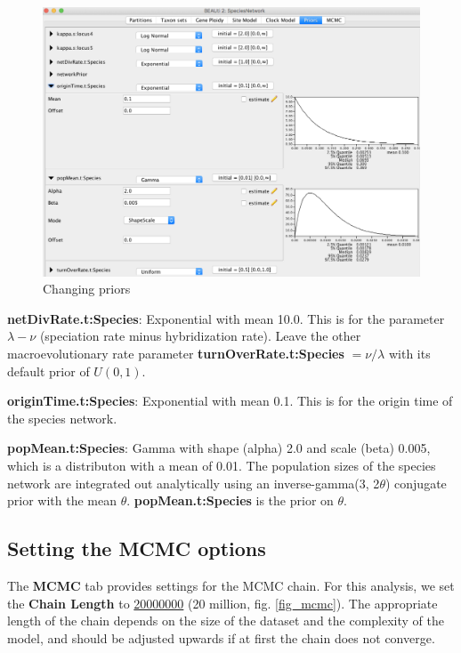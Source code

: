 \documentclass[11pt]{article}
\begin{document}
\begin{figure}[h]
\center
\includegraphics[width=1.0\textwidth]{figs/fig7_priors.png}
\caption{Changing priors}
\label{fig_priors}
\end{figure}

\textbf{netDivRate.t:Species}: Exponential with mean 10.0. This is for the parameter $\lambda-\nu$ (speciation rate minus hybridization rate). Leave the other macroevolutionary rate parameter \textbf{turnOverRate.t:Species} $=\nu/\lambda$ with its default prior of $U(0,1)$.

\textbf{originTime.t:Species}: Exponential with mean 0.1. This is for the origin time of the species network. 

\textbf{popMean.t:Species}: Gamma with shape (alpha) 2.0 and scale (beta) 0.005, which is a distributon with a mean of 0.01. The population sizes of the species network are integrated out analytically using an inverse-gamma(3, 2$\theta$) conjugate prior with the mean $\theta$. \textbf{popMean.t:Species} is the prior on $\theta$.

\subsection*{Setting the MCMC options}

The \textbf{MCMC} tab provides settings for the MCMC chain. For this analysis, we set the \textbf{Chain Length} to \underline{20000000} (20 million, fig. \ref{fig_mcmc}). The appropriate length of the chain depends on the size of the dataset and the complexity of the model, and should be adjusted upwards if at first the chain does not converge.
\end{document}
